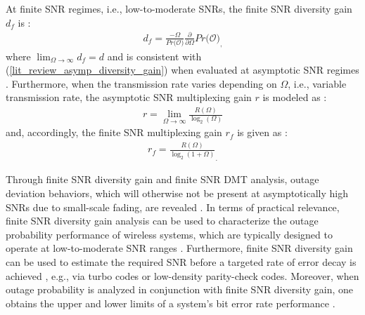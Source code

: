 At finite SNR regimes, i.e., low-to-moderate SNRs, the finite SNR diversity gain $d_f$ is \cite[Eq. (5)]{narasimhan2006finite}:
\begin{eqnarray} \label{lit_review_df}
d_f = \frac{-\Omega}{Pr\big(\mathcal{O}\big)}\frac{\partial}{\partial\Omega}Pr\big(\mathcal{O}\big)_,
\end{eqnarray}
where $\lim_{\Omega\to\infty}d_f = d$ \cite{shin2008diversity, heidarpour2017finite} and is consistent with (\ref{lit_review_asymp_diversity_gain}) when evaluated at asymptotic SNR regimes \cite{zheng2003diversity}. Furthermore, when the transmission rate varies depending on $\Omega$, i.e., variable transmission rate, the asymptotic SNR multiplexing gain $r$ is modeled as \cite{zheng2003diversity}:
\begin{eqnarray} \label{lit_review_asymp_mult_gain}
r = \lim_{\Omega\to\infty} \frac{R(\Omega)}{\log_2(\Omega)}
\end{eqnarray}
and, accordingly, the finite SNR multiplexing gain $r_f$ is given as \cite[Eq. (4)]{narasimhan2006finite}:
\begin{eqnarray} \label{lit_review_rf}
r_f = \frac{R(\Omega)}{\log_2(1+\Omega)}_.
\end{eqnarray}

Through finite SNR diversity gain and finite SNR DMT analysis, outage deviation behaviors, which will otherwise not be present at asymptotically high SNRs due to small-scale fading, are revealed \cite{shin2008diversity}. In terms of practical relevance, finite SNR diversity gain analysis can be used to characterize the outage probability performance of wireless systems, which are typically designed to operate at low-to-moderate SNR ranges \cite{ernest2019outage}. Furthermore, finite SNR diversity gain can be used to estimate the required SNR before a targeted rate of error decay is achieved \cite{narasimhan2006finite}, e.g., via turbo codes or low-density parity-check codes. Moreover, when outage probability is analyzed in conjunction with finite SNR diversity gain, one obtains the upper and lower limits of a system's bit error rate performance \cite{ernest2019outage, zheng2003diversity, nabar2005diversity}. 

